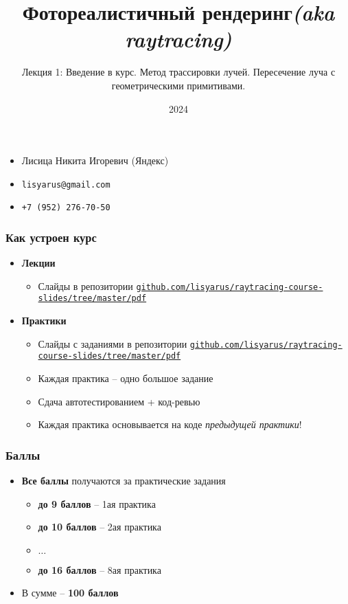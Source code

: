 \documentclass[10pt]{beamer}
\title{Фотореалистичный рендеринг\quad\quad\quad\quad\quad\quad \textit{(aka raytracing)}}
\subtitle{Лекция 1: Введение в курс. Метод трассировки лучей. Пересечение луча с геометрическими примитивами.}
\date{2024}
\begin{document}
\frame{\titlepage}

\begin{frame}
\frametitle{}
\begin{itemize}
\item Лисица Никита Игоревич (Яндекс)
\item \texttt{lisyarus@gmail.com}
\item \texttt{+7 (952) 276-70-50}
\end{itemize}
\end{frame}

\begin{frame}
\frametitle{Как устроен курс}
\begin{itemize}
\item \textbf{Лекции}
\begin{itemize}
\item Слайды в репозитории \href{https://github.com/lisyarus/raytracing-course-slides/tree/master/pdf}{\texttt{github.com/lisyarus/raytracing-course-slides/tree/master/pdf}}
\end{itemize}
\pause
\item \textbf{Практики}
\pause
\begin{itemize}
\item Слайды с заданиями в репозитории \href{https://github.com/lisyarus/raytracing-course-slides/tree/master/pdf}{\texttt{github.com/lisyarus/raytracing-course-slides/tree/master/pdf}}
\pause
\item Каждая практика -- одно большое задание
\pause
\item Сдача автотестированием + код-ревью
\pause
\item Каждая практика основывается на коде \textit{предыдущей практики}!
\end{itemize}
\end{itemize}
\end{frame}

\begin{frame}
\frametitle{Баллы}
\begin{itemize}
\pause
\item \textbf{Все баллы} получаются за практические задания
\pause
\begin{itemize}
\item \textbf{до 9 баллов} -- 1ая практика
\item \textbf{до 10 баллов} -- 2ая практика
\item \begin{math}\dots\end{math}
\item \textbf{до 16 баллов} -- 8ая практика
\end{itemize}
\pause
\item В сумме -- \textbf{100 баллов}
\end{itemize}
\end{frame}
\end{document}
